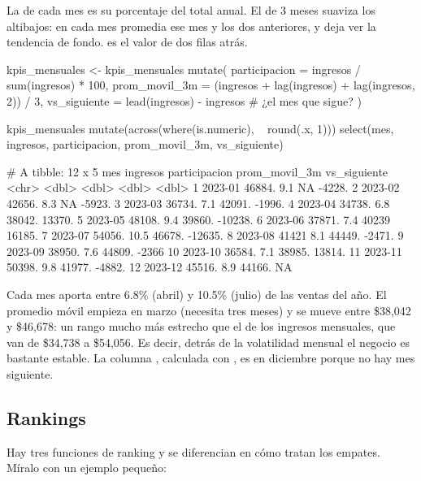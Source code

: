 La  de cada mes es su porcentaje del total anual. El
 de 3 meses suaviza los altibajos: en cada mes
promedia ese mes y los dos anteriores, y deja ver la tendencia de fondo.
 es el valor de dos filas atrás.

\begin{rcode}
kpis_mensuales <- kpis_mensuales %
  mutate(
    participacion = ingresos / sum(ingresos) * 100,
    prom_movil_3m = (ingresos + lag(ingresos) + lag(ingresos, 2)) / 3,
    vs_siguiente  = lead(ingresos) - ingresos     # ¿el mes que sigue?
  )

kpis_mensuales %
  mutate(across(where(is.numeric), ~ round(.x, 1))) %
  select(mes, ingresos, participacion, prom_movil_3m, vs_siguiente)
\end{rcode}
\begin{rsalida}
# A tibble: 12 x 5
   mes     ingresos participacion prom_movil_3m vs_siguiente
   <chr>      <dbl>         <dbl>         <dbl>        <dbl>
 1 2023-01   46884.           9.1           NA        -4228.
 2 2023-02   42656.           8.3           NA        -5923.
 3 2023-03   36734.           7.1        42091.       -1996.
 4 2023-04   34738.           6.8        38042.       13370.
 5 2023-05   48108.           9.4        39860.      -10238.
 6 2023-06   37871.           7.4        40239        16185.
 7 2023-07   54056.          10.5        46678.      -12635.
 8 2023-08   41421            8.1        44449.       -2471.
 9 2023-09   38950.           7.6        44809.       -2366 
10 2023-10   36584.           7.1        38985.       13814.
11 2023-11   50398.           9.8        41977.       -4882.
12 2023-12   45516.           8.9        44166.          NA 
\end{rsalida}

Cada mes aporta entre 6.8\% (abril) y 10.5\% (julio) de las ventas del
año. El promedio móvil empieza en marzo (necesita tres meses) y se mueve
entre \$38,042 y \$46,678: un rango mucho más estrecho que el de los
ingresos mensuales, que van de \$34,738 a \$54,056. Es decir, detrás de la volatilidad mensual el negocio
es bastante estable. La columna , calculada con
, es  en diciembre porque no hay mes siguiente.

\subsection{Rankings}

Hay tres funciones de ranking y se diferencian en cómo tratan los empates.
Míralo con un ejemplo pequeño:

